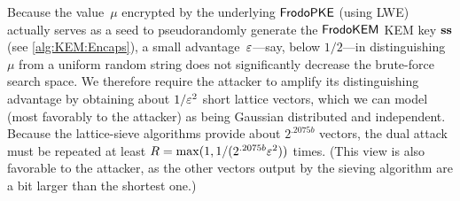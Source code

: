 Because the value~$\mu$ encrypted by the underlying $\textsf{\upshape\mdseries FrodoPKE}$ (using
LWE) actually serves as a seed to pseudorandomly generate the
$\textsf{\upshape\mdseries FrodoKEM}$ KEM key $\mathbf{s}\mathbf{s}$ (see \autoref{alg:KEM:Encaps}), a small
advantage~$\varepsilon$---say, below $1/2$---in distinguishing~$\mu$ from a
uniform random string does not significantly decrease the brute-force
search space.
%
We therefore require the attacker to amplify its distinguishing
advantage by obtaining about $1/\varepsilon^2$ short lattice vectors, which
we can model (most favorably to the attacker) as being Gaussian
distributed and independent.
%
Because the lattice-sieve algorithms provide about $2^{.2075 b}$
vectors, the dual attack must be repeated at least
$R = \max(1, 1/(2^{.2075 b} \varepsilon^2))$ times. (This view is also
favorable to the attacker, as the other vectors output by the sieving
algorithm are a bit larger than the shortest one.)

